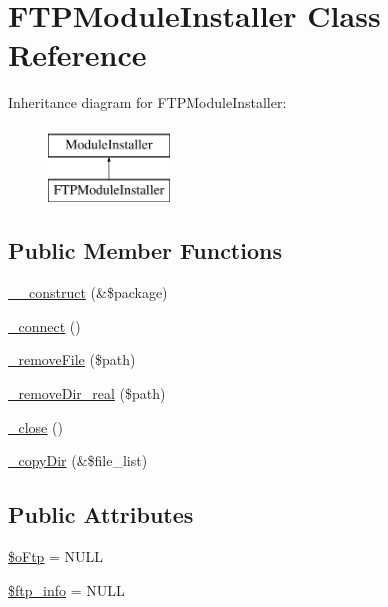 \hypertarget{classFTPModuleInstaller}{\section{F\-T\-P\-Module\-Installer Class Reference}
\label{classFTPModuleInstaller}
}
Inheritance diagram for F\-T\-P\-Module\-Installer\-:\begin{figure}[H]
\begin{center}
\leavevmode
\includegraphics[height=2.000000cm]{classFTPModuleInstaller}
\end{center}
\end{figure}
\subsection*{Public Member Functions}
\begin{DoxyCompactItemize}
\item 
\hyperlink{classFTPModuleInstaller_aafbf226e8ac50e9c3a616f8ac3fef7f5}{\-\_\-\-\_\-construct} (\&\$package)
\item 
\hyperlink{classFTPModuleInstaller_af6dd02408c44cc5e3903e7a8d195314b}{\-\_\-connect} ()
\item 
\hyperlink{classFTPModuleInstaller_a97578f8c7903aded9a0141b1d378713b}{\-\_\-remove\-File} (\$path)
\item 
\hyperlink{classFTPModuleInstaller_a069e2b098a7b06dfcf65bedf41c0fa0c}{\-\_\-remove\-Dir\-\_\-real} (\$path)
\item 
\hyperlink{classFTPModuleInstaller_a283ea106c86af1ab83e97ae852d07f57}{\-\_\-close} ()
\item 
\hyperlink{classFTPModuleInstaller_a48e7b724a4daa35a71163855add13532}{\-\_\-copy\-Dir} (\&\$file\-\_\-list)
\end{DoxyCompactItemize}
\subsection*{Public Attributes}
\begin{DoxyCompactItemize}
\item 
\hyperlink{classFTPModuleInstaller_a7df6cf65240fbb39a7d763e10b236dc9}{\$o\-Ftp} = N\-U\-L\-L
\item 
\hyperlink{classFTPModuleInstaller_afd92e3672f27df9d0056f759cfb4206c}{\$ftp\-\_\-info} = N\-U\-L\-L
\end{DoxyCompactItemize}


